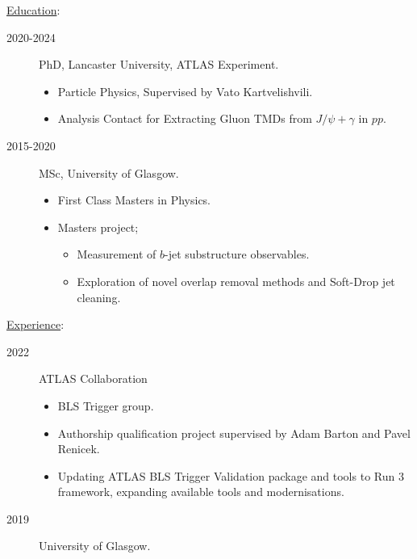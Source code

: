 \documentclass[10pt]{article}
\begin{document}
\begin{bgbox}[height=\paperheight,colback=gray,width=0.7\textwidth]
\small
    \vspace{0.6cm} 
    \flushleft
    \begin{description}
        \item \underline{Education}:
        \begin{description}
            \item[2020-2024] PhD, Lancaster University, ATLAS Experiment.
            \begin{itemize}
                \item Particle Physics, Supervised by Vato Kartvelishvili.
                \item Analysis Contact for Extracting Gluon TMDs from $J/\psi + \gamma$ in $pp$.
            \end{itemize}
            \item[2015-2020] MSc, University of Glasgow.
            \begin{itemize}
                \item First Class Masters in Physics.
                \item Masters project;
                \begin{itemize}
                    \item Measurement of $b$-jet substructure observables.
                    \item Exploration of novel overlap removal methods and Soft-Drop jet cleaning.
                \end{itemize}
            \end{itemize}
        \end{description}
        \item \underline{Experience}:
        \begin{description}
            \item[2022] ATLAS Collaboration
            \begin{itemize}
                \item BLS Trigger group.
                \item Authorship qualification project supervised by Adam Barton and Pavel Renicek.
                \item Updating ATLAS BLS Trigger Validation package and tools to Run 3 framework, expanding available tools and modernisations.
            \end{itemize}
            \item[2019] University of Glasgow.

\end{description}
\end{description}
\end{bgbox}
\end{document}
